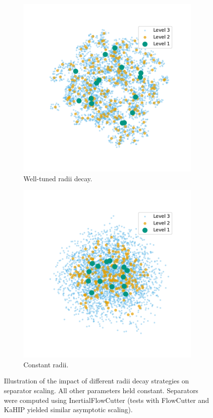\begin{figure}[tbhp]
\begin{subfigure}{0.3\linewidth}
		\includegraphics[width=\linewidth]{graphics/good.pdf}
		\caption{Well-tuned radii decay.}
		\label{fig:radius_good}
	\end{subfigure}
	\hfill
	\begin{subfigure}{0.3\linewidth}
		\centering
		\includegraphics[width=\linewidth]{graphics/const.pdf}
		\caption{Constant radii.}
		\label{fig:radius_const}
	\end{subfigure}
	\caption{Illustration of the impact of different radii decay strategies on separator scaling. All other parameters held constant. Separators were computed using InertialFlowCutter (tests with FlowCutter and KaHIP yielded similar asymptotic scaling).}
	\label{fig:radius_compare}
\end{figure}

